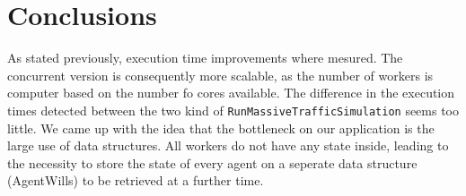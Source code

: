 \documentclass[12pt, a4paper]{report}
\begin{document}
\chapter{Conclusions}
As stated previously, execution time improvements where mesured. The concurrent version is consequently more scalable, as the number of workers is computer based on the number fo cores available. The difference in the execution times detected between the two kind of \texttt{RunMassiveTrafficSimulation} seems too little. We came up with the idea that the bottleneck on our application is the large use of data structures. All workers do not have any state inside, leading to the necessity to store the state of every agent on a seperate data structure (AgentWills) to be retrieved at a further time.



\end{document}
